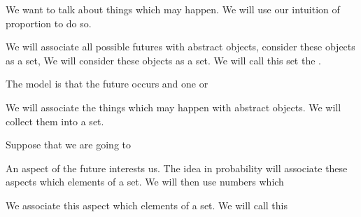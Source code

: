

We want to talk about
things which may happen.
We will use our intuition
of proportion to do so.


We will associate all possible
futures with abstract objects,
consider these objects as a set,
We will consider these
objects as a set.
We will call this set
the .

The model is that the future
occurs and one or

We will associate the
things which may happen
with abstract objects.
We will collect them
into a set.

Suppose that we are going to

An aspect of the future
interests us. The idea
in probability will associate
these aspects which elements
of a set.
We will then use numbers which

We associate
this aspect which elements
of a set.
We will call this
